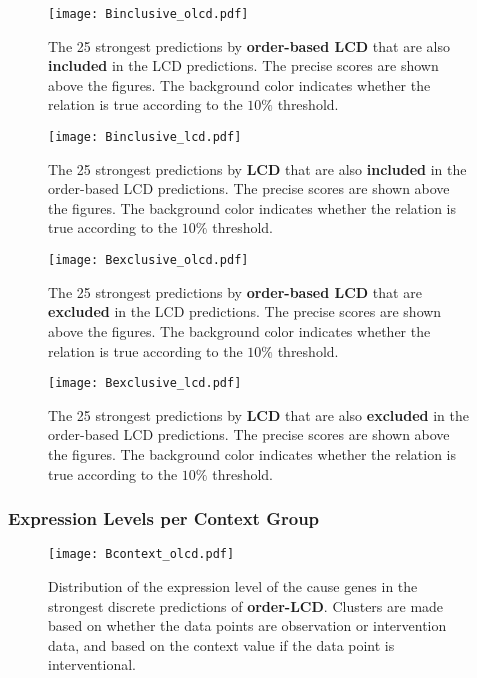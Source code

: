\begin{figure}[H]
    \centering
    \texttt{[image: Binclusive\_olcd.pdf]}
    \caption{The 25 strongest predictions by \textbf{order-based LCD} that are also \textbf{included} in the LCD predictions. The precise scores are shown above the figures. The background color indicates whether the relation is true according to the $10\%$ threshold.}
\end{figure}

\begin{figure}[H]
    \centering
    \texttt{[image: Binclusive\_lcd.pdf]}
    \caption{The 25 strongest predictions by \textbf{LCD} that are also \textbf{included} in the order-based LCD predictions. The precise scores are shown above the figures. The background color indicates whether the relation is true according to the $10\%$ threshold.}
\end{figure}

\begin{figure}[H]
    \centering
    \texttt{[image: Bexclusive\_olcd.pdf]}
    \caption{The 25 strongest predictions by \textbf{order-based LCD} that are \textbf{excluded} in the LCD predictions. The precise scores are shown above the figures. The background color indicates whether the relation is true according to the $10\%$ threshold.}
\end{figure}

\begin{figure}[H]
    \centering
    \texttt{[image: Bexclusive\_lcd.pdf]}
    \caption{The 25 strongest predictions by \textbf{LCD} that are also \textbf{excluded} in the order-based LCD predictions. The precise scores are shown above the figures. The background color indicates whether the relation is true according to the $10\%$ threshold.}
\end{figure}


\subsubsection{Expression Levels per Context Group}

\begin{figure}[H]
    \centering
    \texttt{[image: Bcontext\_olcd.pdf]}
    \caption{Distribution of the expression level of the cause genes in the strongest discrete predictions of \textbf{order-LCD}. Clusters are made based on whether the data points are observation or intervention data, and based on the context value if the data point is interventional.}
\end{figure}

